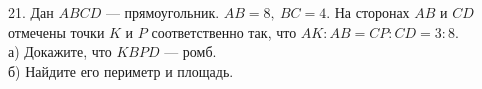 21. Дан $ABCD$ --- прямоугольник. $AB=8,\ BC=4.$ На сторонах $AB$ и $CD$ отмечены точки $K$ и $P$ соответственно так, что $AK:AB=CP:CD=3:8.$\\
а) Докажите, что $KBPD$ --- ромб.\\
б) Найдите его периметр и площадь.\\

